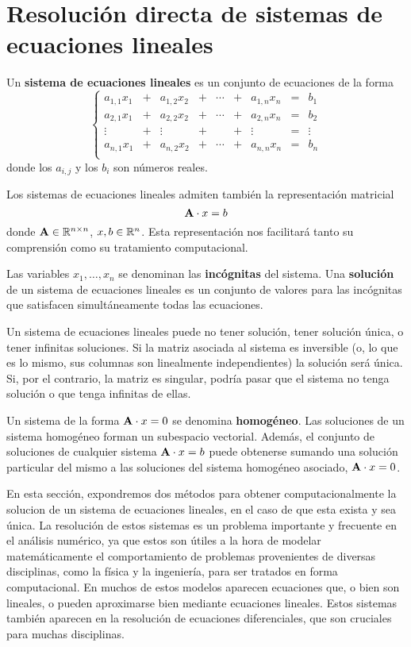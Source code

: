 
\section{Resolución directa de sistemas de ecuaciones lineales}
\label{section:sistemas-lineales}

Un \textbf{sistema de ecuaciones lineales} es un conjunto de ecuaciones de la
forma
\[ \left\lbrace \begin{matrix}
    a_{1,1} x_1 &+& a_{1,2} x_2 &+& \cdots &+& a_{1,n} x_n & = & b_1    \\
    a_{2,1} x_1 &+& a_{2,2} x_2 &+& \cdots &+& a_{2,n} x_n & = & b_2    \\
    \vdots     &+& \vdots     &+&     &+& \vdots     & = & \vdots \\
    a_{n,1} x_1 &+& a_{n,2} x_2 &+& \cdots &+& a_{n,n} x_n & = & b_n    \\
\end{matrix} \right. \]
donde los $a_{i,j}$ y los $b_i$ son números reales.

Los sistemas de ecuaciones lineales admiten también la representación
matricial
\[ \mathbf{A} \cdot x = b \]
donde $\mathbf{A} \in \mathbb{R} ^{n \times n}$, $x, b \in \mathbb{R}^{n}$. Esta
representación nos facilitará tanto su comprensión como su tratamiento
computacional.

Las variables $x_1, \dots, x_n$ se denominan las \textbf{incógnitas} del
sistema.
Una \textbf{solución} de un sistema de ecuaciones lineales es un conjunto de
valores para las incógnitas que satisfacen simultáneamente todas las
ecuaciones.

Un sistema de ecuaciones lineales puede no tener solución, tener solución
única, o tener infinitas soluciones. Si la matriz asociada al sistema es
inversible (o, lo que es lo mismo, sus columnas son linealmente
independientes)
la solución será única. Si, por el contrario, la matriz es singular,
podría pasar que el sistema no tenga solución o que tenga infinitas de ellas.

Un sistema de la forma $\mathbf{A} \cdot x = 0$ se denomina \textbf{homogéneo}.
Las soluciones de un sistema homogéneo forman un subespacio vectorial. Además,
el conjunto de soluciones de cualquier sistema $\mathbf{A} \cdot x = b$ puede
obtenerse sumando una solución particular del mismo a las soluciones del
sistema homogéneo asociado, $\mathbf{A} \cdot x = 0$.

En esta sección, expondremos dos métodos para obtener computacionalmente la
solucion de un sistema de ecuaciones lineales, en el caso de que esta exista y
sea única. La resolución de estos sistemas es un problema importante y
frecuente en el análisis numérico, ya que estos son útiles a la hora de
modelar matemáticamente el comportamiento de problemas provenientes de
diversas disciplinas, como la física y la ingeniería, para ser tratados en
forma computacional. En muchos de estos modelos aparecen ecuaciones
que, o bien son lineales, o pueden aproximarse bien mediante ecuaciones
lineales. Estos sistemas también aparecen en la resolución de ecuaciones
diferenciales, que son cruciales para muchas disciplinas.

